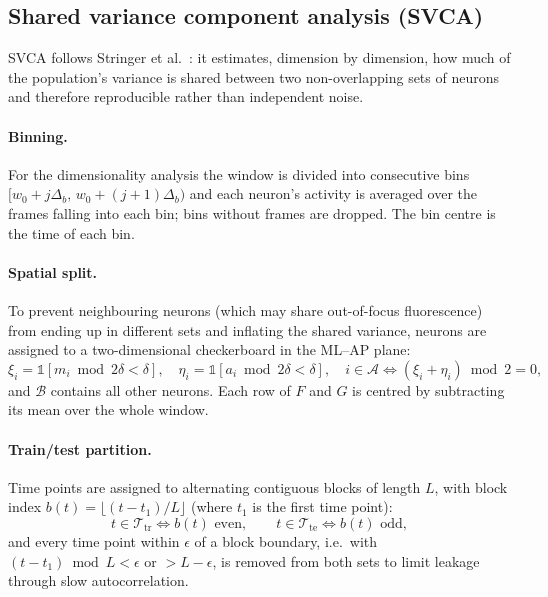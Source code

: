 \documentclass[11pt]{article}
\begin{document}
\subsection{Shared variance component analysis (SVCA)}

SVCA follows Stringer et al.~\cite{stringer2019}: it estimates, dimension by dimension, how much of the population's variance is shared between two non-overlapping sets of neurons and therefore reproducible rather than independent noise.

\paragraph{Binning.} For the dimensionality analysis the window is divided into consecutive bins $[w_0 + j\Delta_b,\, w_0 + (j+1)\Delta_b)$ and each neuron's activity is averaged over the frames falling into each bin; bins without frames are dropped. The bin centre is the time of each bin.

\paragraph{Spatial split.} To prevent neighbouring neurons (which may share out-of-focus fluorescence) from ending up in different sets and inflating the shared variance, neurons are assigned to a two-dimensional checkerboard in the ML--AP plane:
\begin{equation}
  \xi_i = \mathbb{1}\!\left[m_i \bmod 2\delta < \delta\right], \quad
  \eta_i = \mathbb{1}\!\left[a_i \bmod 2\delta < \delta\right], \quad
  i \in \mathcal{A} \iff (\xi_i + \eta_i) \bmod 2 = 0,
\end{equation}
and $\mathcal{B}$ contains all other neurons. Each row of $F$ and $G$ is centred by subtracting its mean over the whole window.

\paragraph{Train/test partition.} Time points are assigned to alternating contiguous blocks of length $L$, with block index $b(t) = \lfloor (t - t_1)/L \rfloor$ (where $t_1$ is the first time point):
\begin{equation}
  t \in \mathcal{T}_{\mathrm{tr}} \iff b(t) \text{ even}, \qquad t \in \mathcal{T}_{\mathrm{te}} \iff b(t) \text{ odd},
\end{equation}
and every time point within $\epsilon$ of a block boundary, i.e.\ with $(t - t_1) \bmod L < \epsilon$ or $> L - \epsilon$, is removed from both sets to limit leakage through slow autocorrelation.
\end{document}
